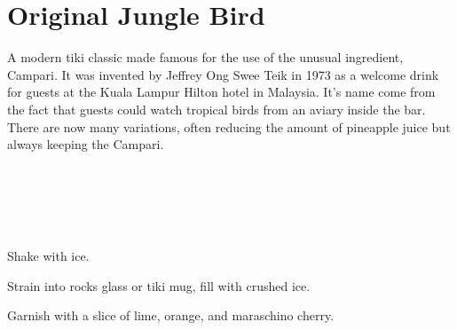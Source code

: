 \section[Jungle Bird]{Original Jungle Bird}

\begin{recipestats}[
	servings=1,
	preptime=5~\minute,
	original=\citefield{originalJungleBird}{title} \cite{originalJungleBird},
]
\end{recipestats}


\begin{recipeabstract}
	A modern tiki classic made famous for the use of the unusual ingredient, Campari.
	It was invented by Jeffrey Ong Swee Teik in 1973 as a welcome drink for guests at the Kuala Lampur Hilton hotel in Malaysia\cite{cocktailSeminars2021}.
	It's name come from the fact that guests could watch tropical birds from an aviary inside the bar.
	There are now many variations, often reducing the amount of pineapple juice but always keeping the Campari.
\end{recipeabstract}


\begin{ingredientcolumns}[1]
	\begin{ingredientblock}
		\\
		\\
		\\
		\\
	\end{ingredientblock}
\end{ingredientcolumns}


\begin{preparation}
\item Shake with ice.
\item Strain into rocks glass or tiki mug, fill with crushed ice.
\item Garnish with a slice of lime, orange, and maraschino cherry.
\end{preparation}


\recipeend
